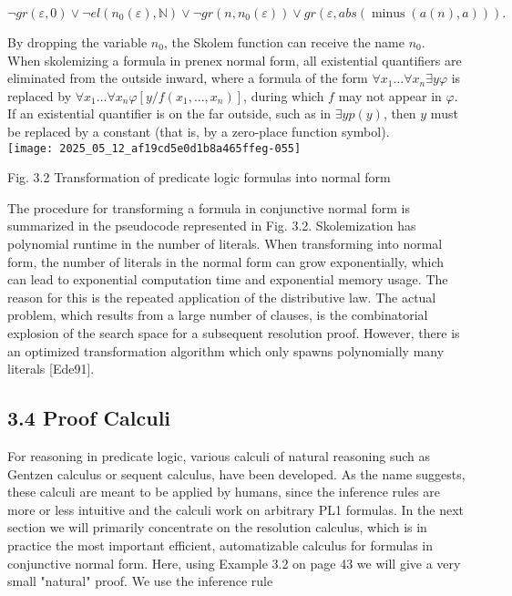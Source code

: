 \documentclass[10pt]{article}
\begin{document}
$$
\neg g r(\varepsilon, 0) \vee \neg e l\left(n_{0}(\varepsilon), \mathbb{N}\right) \vee \neg g r\left(n, n_{0}(\varepsilon)\right) \vee g r(\varepsilon, a b s(\operatorname{minus}(a(n), a))) .
$$

By dropping the variable $n_{0}$, the Skolem function can receive the name $n_{0}$.\\
When skolemizing a formula in prenex normal form, all existential quantifiers are eliminated from the outside inward, where a formula of the form $\forall x_{1} \ldots \forall x_{n} \exists y \varphi$ is replaced by $\forall x_{1} \ldots \forall x_{n} \varphi\left[y / f\left(x_{1}, \ldots, x_{n}\right)\right]$, during which $f$ may not appear in $\varphi$. If an existential quantifier is on the far outside, such as in $\exists y p(y)$, then $y$ must be replaced by a constant (that is, by a zero-place function symbol).\\
\texttt{[image: 2025\_05\_12\_af19cd5e0d1b8a465ffeg-055]}

Fig. 3.2 Transformation of predicate logic formulas into normal form

The procedure for transforming a formula in conjunctive normal form is summarized in the pseudocode represented in Fig. 3.2. Skolemization has polynomial runtime in the number of literals. When transforming into normal form, the number of literals in the normal form can grow exponentially, which can lead to exponential computation time and exponential memory usage. The reason for this is the repeated application of the distributive law. The actual problem, which results from a large number of clauses, is the combinatorial explosion of the search space for a subsequent resolution proof. However, there is an optimized transformation algorithm which only spawns polynomially many literals [Ede91].

\subsection*{3.4 Proof Calculi}
For reasoning in predicate logic, various calculi of natural reasoning such as Gentzen calculus or sequent calculus, have been developed. As the name suggests, these calculi are meant to be applied by humans, since the inference rules are more or less intuitive and the calculi work on arbitrary PL1 formulas. In the next section we will primarily concentrate on the resolution calculus, which is in practice the most important efficient, automatizable calculus for formulas in conjunctive normal form. Here, using Example 3.2 on page 43 we will give a very small "natural" proof. We use the inference rule
\end{document}
